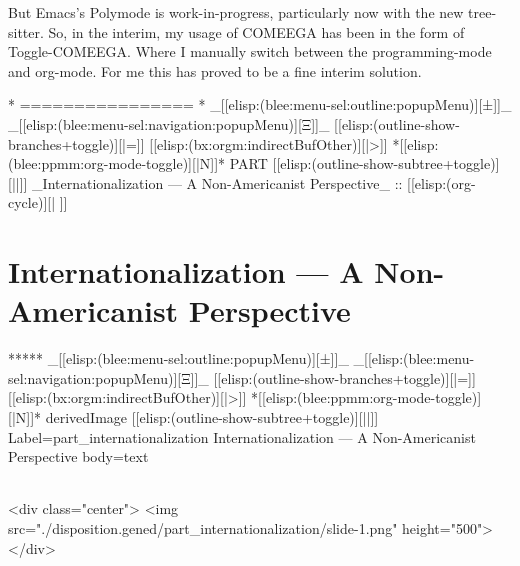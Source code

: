 \begin{whenOrg}
\begin{verblatex}
\begin{frame}[fragile,plain,label=comeega]
{  But Emacs's Polymode is work-in-progress, particularly now with the
  new tree-sitter. So, in the interim, my usage of COMEEGA has been in the form of
  Toggle-COMEEGA. Where I manually switch between the programming-mode and org-mode. For
  me this has proved to be a fine interim solution.
}

\end{frame}
\end{verblatex}


\begin{whenOrg}
*      ================
*  _[[elisp:(blee:menu-sel:outline:popupMenu)][±]]_ _[[elisp:(blee:menu-sel:navigation:popupMenu)][Ξ]]_ [[elisp:(outline-show-branches+toggle)][|=]] [[elisp:(bx:orgm:indirectBufOther)][|>]] *[[elisp:(blee:ppmm:org-mode-toggle)][|N]]*  PART       [[elisp:(outline-show-subtree+toggle)][||]]   _Internationalization --- A Non-Americanist Perspective_ ::  [[elisp:(org-cycle)][| ]]
\end{whenOrg}

\newpage
\part{Internationalization --- A Non-Americanist Perspective}

\begin{whenOrg}
*****  _[[elisp:(blee:menu-sel:outline:popupMenu)][±]]_ _[[elisp:(blee:menu-sel:navigation:popupMenu)][Ξ]]_ [[elisp:(outline-show-branches+toggle)][|=]] [[elisp:(bx:orgm:indirectBufOther)][|>]] *[[elisp:(blee:ppmm:org-mode-toggle)][|N]]*  derivedImage [[elisp:(outline-show-subtree+toggle)][||]] Label=part_internationalization Internationalization --- A Non-Americanist Perspective body=text
\end{whenOrg}

\begin{htmlonly}

\begin{frame}[fragile,plain,label=part_internationalization]
    \frametitle{}
    \framesubtitle{}
    \begin{rawhtml}
<div class="center">
<img src="./disposition.gened/part_internationalization/slide-1.png" height="500">
</div>
    \end{rawhtml}
\end{frame}
\end{htmlonly}


\end{whenOrg}
